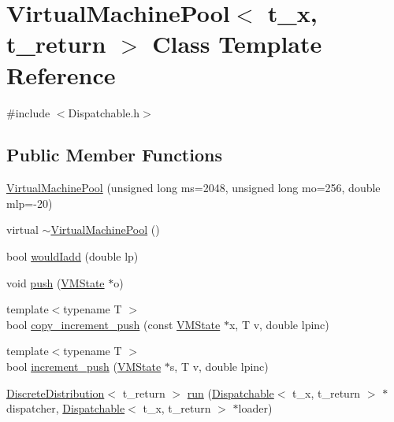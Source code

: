 \hypertarget{class_virtual_machine_pool}{}\section{Virtual\+Machine\+Pool$<$ t\+\_\+x, t\+\_\+return $>$ Class Template Reference}
\label{class_virtual_machine_pool}


{\ttfamily \#include $<$Dispatchable.\+h$>$}

\subsection*{Public Member Functions}
\begin{DoxyCompactItemize}
\item 
\hyperlink{class_virtual_machine_pool_abe43be5b1c5e9c1305b237a4a2bd209b}{Virtual\+Machine\+Pool} (unsigned long ms=2048, unsigned long mo=256, double mlp=-\/20)
\item 
virtual \hyperlink{class_virtual_machine_pool_a8fd087ac2d947b46b4be4d5e1baf1682}{$\sim$\+Virtual\+Machine\+Pool} ()
\item 
bool \hyperlink{class_virtual_machine_pool_a4313a26d5523b4ad07927c9de2344c2e}{would\+Iadd} (double lp)
\item 
void \hyperlink{class_virtual_machine_pool_a6f49ab47e6d472b5a9f429e96364b4c6}{push} (\hyperlink{class_virtual_machine_state}{V\+M\+State} $\ast$o)
\item 
{\footnotesize template$<$typename T $>$ }\\bool \hyperlink{class_virtual_machine_pool_a022aad4a11f24264fd7d11060d041852}{copy\+\_\+increment\+\_\+push} (const \hyperlink{class_virtual_machine_state}{V\+M\+State} $\ast$x, T v, double lpinc)
\item 
{\footnotesize template$<$typename T $>$ }\\bool \hyperlink{class_virtual_machine_pool_a3997e8c0a6581b5f68f6ff568dbb53e4}{increment\+\_\+push} (\hyperlink{class_virtual_machine_state}{V\+M\+State} $\ast$s, T v, double lpinc)
\item 
\hyperlink{class_discrete_distribution}{Discrete\+Distribution}$<$ t\+\_\+return $>$ \hyperlink{class_virtual_machine_pool_afee0d242681df11e7ecded1c31f37669}{run} (\hyperlink{class_dispatchable}{Dispatchable}$<$ t\+\_\+x, t\+\_\+return $>$ $\ast$dispatcher, \hyperlink{class_dispatchable}{Dispatchable}$<$ t\+\_\+x, t\+\_\+return $>$ $\ast$loader)
\end{DoxyCompactItemize}
